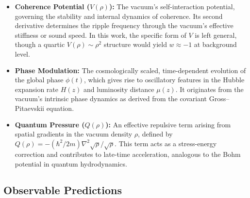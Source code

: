 \begin{itemize}[leftmargin=*]
    \item \textbf{Coherence Potential (\( V(\rho) \)):} The vacuum’s self-interaction potential, governing the stability and internal dynamics of coherence. Its second derivative determines the ripple frequency through the vacuum's effective stiffness or sound speed. In this work, the specific form of \( V \) is left general, though a quartic \( V(\rho) \sim \rho^2 \) structure would yield \( w \approx -1 \) at background level.

    \item \textbf{Phase Modulation:} The cosmologically scaled, time-dependent evolution of the global phase \( \phi(t) \), which gives rise to oscillatory features in the Hubble expansion rate \( H(z) \) and luminosity distance \( \mu(z) \). It originates from the vacuum’s intrinsic phase dynamics as derived from the covariant Gross–Pitaevskii equation.

    \item \textbf{Quantum Pressure (\( Q(\rho) \)):} An effective repulsive term arising from spatial gradients in the vacuum density \( \rho \), defined by \( Q(\rho) = -(\hbar^2 / 2m) \nabla^2 \sqrt{\rho} / \sqrt{\rho} \). This term acts as a stress-energy correction and contributes to late-time acceleration, analogous to the Bohm potential in quantum hydrodynamics.
\end{itemize}

\subsection{Observable Predictions}

